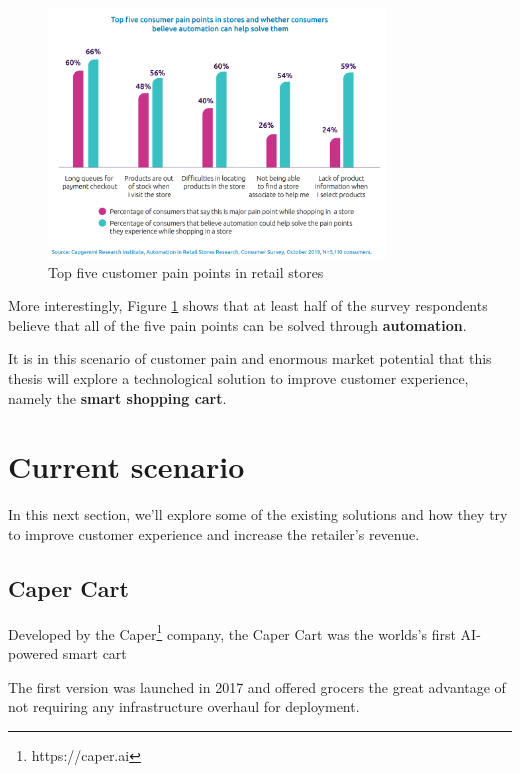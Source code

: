 \documentclass[openright]{normas-utf-tex} %
\begin{document}
\begin{figure}[H]
	\centering
	\includegraphics[width=0.8\textwidth]{./images/painpoints.png}
    \caption[Top five customer pain points in retail stores]{Top five customer pain points in retail stores}
    \label{fig:capgemini}
\end{figure}

More interestingly, Figure \ref{fig:capgemini} shows that at least half of the
survey respondents believe that all of the five pain points can be solved through
\textbf{automation}.

It is in this scenario of customer pain and enormous market potential that this
thesis will explore a technological solution to improve customer experience,
namely the \textbf{smart shopping cart}.

\section{Current scenario}

In this next section, we'll explore some of the existing solutions and how they
try to improve customer experience and increase the retailer's revenue.

\subsection{Caper Cart}

Developed by the Caper\footnote{https://caper.ai} company, the Caper Cart was the worlds's first AI-powered smart cart \cite{Caper2020}

The first version was launched in 2017 and offered grocers the
great advantage of not requiring any infrastructure overhaul for deployment.
\end{document}
